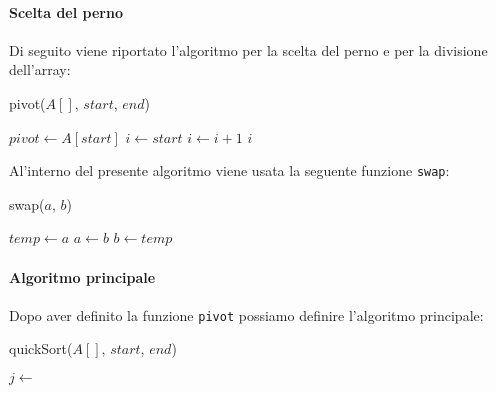     \paragraph{Scelta del perno} 
        Di seguito viene riportato l'algoritmo per la scelta del perno e per la divisione dell'array:
        \begin{algorithm}[H]
            \caption{\Int pivot(\Item $A[]$, \Int $start$, \Int $end$)}
            \begin{algorithmic}
                \State \Item $pivot \gets A[start]$
                \State \Int $i \gets start$
                        \State $i \gets i+1$
                        \State {}
                    \EndIf
                \EndFor
                \State {}
                \State \Return $i$
            \end{algorithmic}
        \end{algorithm}
        Al'interno del presente algoritmo viene usata la seguente funzione \texttt{swap}:
        \begin{algorithm}[H]
            \caption{swap(\Item $a$, \Item $b$)}
            \begin{algorithmic}
                \State \Item $temp \gets a$
                \State $a \gets b$
                \State $b \gets temp$
            \end{algorithmic}
        \end{algorithm}
    \paragraph{Algoritmo principale} Dopo aver definito la funzione \texttt{pivot} possiamo definire l'algoritmo principale:
        \begin{algorithm}[H]
            \caption{quickSort(\Item $A[]$, \Int $start$, \Int $end$)}
            \begin{algorithmic}
                    \State \Int $j \gets$ 
                    \State {}
                    \State {}
                \EndIf
            \end{algorithmic}
        \end{algorithm}
